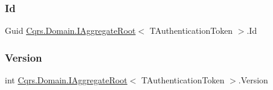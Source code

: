 \subsubsection{\texorpdfstring{Id}{Id}}
{\footnotesize\ttfamily Guid \hyperlink{interfaceCqrs_1_1Domain_1_1IAggregateRoot}{Cqrs.\+Domain.\+I\+Aggregate\+Root}$<$ T\+Authentication\+Token $>$.Id\hspace{0.3cm}{\ttfamily [get]}}

\mbox{\label{interfaceCqrs_1_1Domain_1_1IAggregateRoot_ad81adab68c0984330f735a1f5a661aa7}} 
\subsubsection{\texorpdfstring{Version}{Version}}
{\footnotesize\ttfamily int \hyperlink{interfaceCqrs_1_1Domain_1_1IAggregateRoot}{Cqrs.\+Domain.\+I\+Aggregate\+Root}$<$ T\+Authentication\+Token $>$.Version\hspace{0.3cm}{\ttfamily [get]}}

